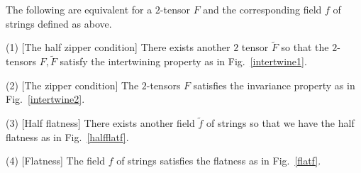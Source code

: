 \documentclass[12pt]{article}
\begin{document}
\begin{theorem}\label{zipper}
The following are equivalent for a $2$-tensor $F$ and 
the corresponding field $f$ of strings defined as above.

\textnormal{(1) [The half zipper condition]}
There exists another $2$ tensor $\tilde F$ so that
the $2$-tensors $F, \tilde F$ satisfy the intertwining property 
as in Fig.~\ref{intertwine1}.

\textnormal{(2) [The zipper condition]}
The $2$-tensors $F$ satisfies the invariance property 
as in Fig.~\ref{intertwine2}.

\textnormal{(3) [Half flatness]}
There exists another field $\tilde f$ of strings so that we have
the half flatness as in Fig.~\ref{halfflatf}.

\textnormal{(4) [Flatness]}
The field $f$ of strings satisfies
the flatness as in Fig.~\ref{flatf}.
\end{theorem}
\end{document}
